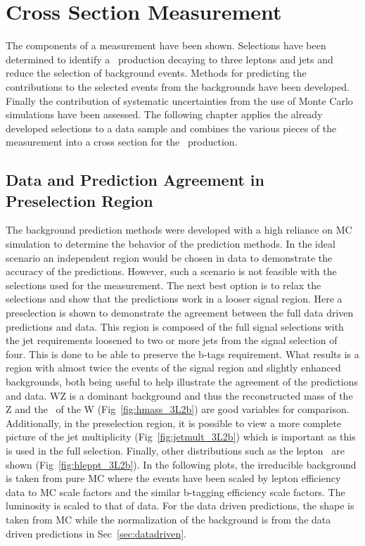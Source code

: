 \chapter{\ttZ Cross Section Measurement}
The components of a measurement have been shown. Selections have been determined to identify a \ttZ \ production decaying to three leptons and jets and reduce the selection of background events. Methods for predicting the contributions to the selected events from the backgrounds have been developed. Finally the contribution of systematic uncertainties from the use of Monte Carlo simulations have been assessed. The following chapter applies the already developed selections to a data sample and combines the various pieces of the measurement into a cross section for the \ttZ \ production.\\

         \section{Data and Prediction Agreement in Preselection Region}
         The background prediction methods were developed with a high reliance on MC simulation to determine the behavior of the prediction methods. In the ideal scenario an independent region would be chosen in data to demonstrate the accuracy of the predictions. However, such a scenario is not feasible with the selections used for the \ttZ measurement. The next best option is to relax the selections and show that the predictions work in a looser signal region. Here a preselection is shown to demonstrate the agreement between the full data driven predictions and data. This region is composed of the full signal selections with the jet requirements loosened to two or more jets from the signal selection of four. This is done to be able to preserve the b-tags requirement. What results is a region with almost twice the events of the signal region and slightly enhanced backgrounds, both being useful to help illustrate the agreement of the predictions and data. WZ is a dominant background and thus the reconstructed mass of the Z and the \Mt \ of the W (Fig~\ref{fig:hmass_3L2b}) are good variables for comparison. Additionally, in the preselection region, it is possible to view a more complete picture of the jet multiplicity (Fig~\ref{fig:jetmult_3L2b}) which is important as this is used in the full selection. Finally, other distributions such as the lepton \pt \ are shown (Fig~\ref{fig:hleppt_3L2b}). In the following plots, the irreducible background is taken from pure MC where the events have been scaled by lepton efficiency data to MC scale factors and the similar b-tagging efficiency scale factors. The luminosity is scaled to that of data. For the data driven predictions, the shape is taken from MC while the normalization of the background is from the data driven predictions in Sec~\ref{sec:datadriven}.

